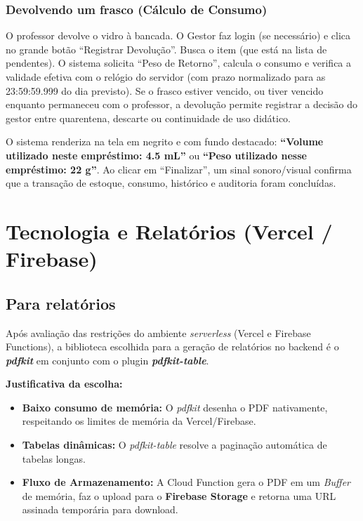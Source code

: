 \documentclass[12pt,a4paper]{article}
\begin{document}
\subsubsection{Devolvendo um frasco (Cálculo de Consumo)}
O professor devolve o vidro à bancada. O Gestor faz login (se necessário) e clica no grande botão ``Registrar Devolução''. Busca o item (que está na lista de pendentes). O sistema solicita ``Peso de Retorno'', calcula o consumo e verifica a validade efetiva com o relógio do servidor (com prazo normalizado para as 23:59:59.999 do dia previsto). Se o frasco estiver vencido, ou tiver vencido enquanto permaneceu com o professor, a devolução permite registrar a decisão do gestor entre quarentena, descarte ou continuidade de uso didático.

O sistema renderiza na tela em negrito e com fundo destacado: \textbf{``Volume utilizado neste empréstimo: 4.5 mL''} ou \textbf{``Peso utilizado nesse empréstimo: 22 g''}. Ao clicar em ``Finalizar'', um sinal sonoro/visual confirma que a transação de estoque, consumo, histórico e auditoria foram concluídas.

\newpage
\section{Tecnologia e Relatórios (Vercel / Firebase)}

\subsection{Para relatórios}
Após avaliação das restrições do ambiente \textit{serverless} (Vercel e Firebase Functions), a biblioteca escolhida para a geração de relatórios no backend é o \textbf{\textit{pdfkit}} em conjunto com o plugin \textbf{\textit{pdfkit-table}}.

\textbf{Justificativa da escolha:}
\begin{itemize}
    \item \textbf{Baixo consumo de memória:} O \textit{pdfkit} desenha o PDF nativamente, respeitando os limites de memória da Vercel/Firebase.
    \item \textbf{Tabelas dinâmicas:} O \textit{pdfkit-table} resolve a paginação automática de tabelas longas.
    \item \textbf{Fluxo de Armazenamento:} A Cloud Function gera o PDF em um \textit{Buffer} de memória, faz o upload para o \textbf{Firebase Storage} e retorna uma URL assinada temporária para download.
\end{itemize}
\end{document}
